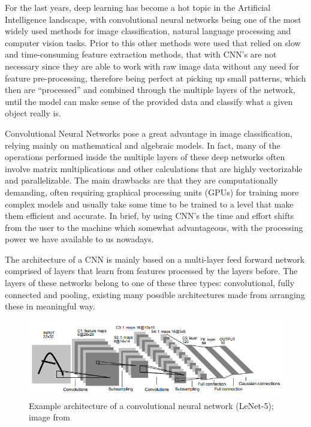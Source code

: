 \documentclass[journal, a4paper]{IEEEtran}
\begin{document}
For the last years, deep learning has become a hot topic in the Artificial 
Intelligence landscape, with convolutional neural networks being one
of the most widely used methods for image classification, natural language
processing and computer vision tasks. Prior to this other methods were used
that relied on slow and time-consuming feature extraction methods, that 
with CNN's are not necessary since they are able to work with raw image data
without any need for feature pre-processing, therefore being perfect at picking up 
small patterns, which then are ``processed'' and combined through the multiple 
layers of the network, until the model can make sense of the provided data 
and classify what a given object really is.

Convolutional Neural Networks pose a great advantage in image classification, relying mainly on 
mathematical and algebraic models. In fact, many of the operations performed inside
the multiple layers of these deep networks often involve matrix multiplications
and other calculations that are highly vectorizable and parallelizable. 
The main drawbacks are that they are computationally demanding, often 
requiring graphical processing units (GPUs) for training more complex models 
and usually take some time to be trained to a level that make them efficient 
and accurate. In brief, by using CNN's the time and effort shifts from the 
user to the machine which somewhat advantageous, with the processing power
we have available to us nowadays.

The architecture of a CNN is mainly based on a multi-layer feed forward network
comprised of layers that learn from features processed by the layers before. 
The layers of these networks belong to one of these three types: convolutional, 
fully connected and pooling, existing many possible architectures made from 
arranging these in meaningful way.

\begin{figure}[htpb]
    \centering
    \includegraphics[scale=0.30]{LeNet-5}
    \caption[CNN]{Example architecture of a convolutional neural network 
      (LeNet-5); image from \parencite{LeNet-5}}
    \label{cnn}
\end{figure}
\end{document}
